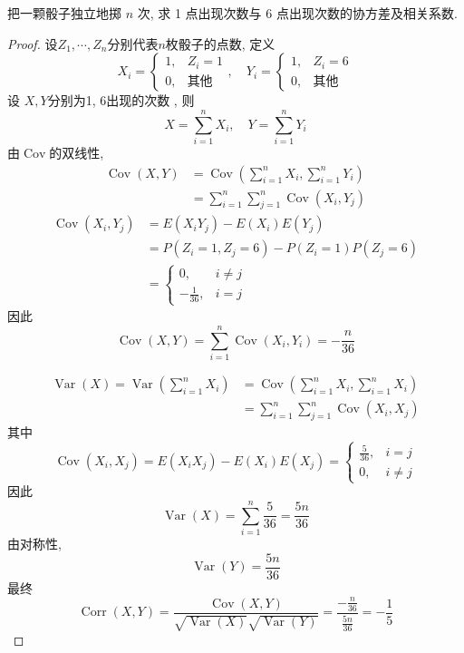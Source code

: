 \documentclass[../main.tex]{subfiles}
\begin{document}
\begin{exercise}{}{}
把一颗骰子独立地掷 \(n\) 次, 求 1 点出现次数与 6 点出现次数的协方差及相关系数.
\end{exercise}
\begin{proof}
  设\(  Z_1,\cdots ,Z_{n}  \)分别代表\(  n  \)枚骰子的点数, 定义 \[
  X_{i}= \begin{cases} 1,& Z_{i}= 1\\ 
   0,& \text{其他} \end{cases} ,\quad Y_{i}= \begin{cases} 1,&Z_{i}= 6\\ 
    0, & \text{其他} \end{cases} 
  \]  设 \(  X,Y  \)分别为1, 6出现的次数 , 则 \[
  X= \sum _{i= 1}^{n}X_{i}, \quad Y= \sum _{i= 1}^{n}Y_{i}
  \]由\(  \operatorname{Cov}  \)的双线性,  \[
  \begin{aligned}
  \operatorname{Cov}\left( X,Y \right)&= \operatorname{Cov}\left( \sum _{i= 1}^{n}X_{i},\sum _{i= 1}^{n}Y_{i} \right)\\ 
   &= \sum _{i = 1}^{n}\sum _{j= 1}^{n}\operatorname{Cov}\left( X_{i},Y_{j} \right)    
  \end{aligned}
  \]  \[
  \begin{aligned}
  \operatorname{Cov}\left( X_{i},Y_{j} \right)&= E\left( X_{i}Y_{j} \right)-E\left( X_{i} \right)E\left( Y_{j} \right)   \\ 
   &= P\left( Z_{i}= 1, Z_{j}= 6 \right) -P\left( Z_{i}= 1 \right)P\left( Z_{j}= 6 \right)  \\ 
    &= \begin{cases} 0,&i\neq j\\ 
     -\frac{1}{36},& i= j \end{cases} 
  \end{aligned}  
  \]因此 \[
  \operatorname{Cov}\left( X,Y \right) = \sum _{i = 1}^{n}\operatorname{Cov}\left( X_{i},Y_{i} \right)= -\frac{n }{36 }  
  \]

  \[
 \begin{aligned}
  \operatorname{Var}\left( X \right) = \operatorname{Var}\left( \sum _{i= 1}^{n}X_{i} \right)&= \operatorname{Cov}\left( \sum _{i= 1}^{n}X_{i},\sum _{i= 1}^{n}X_{i} \right)\\ 
   &= \sum _{i= 1}^{n}\sum _{j= 1}^{n}\operatorname{Cov}\left( X_{i},X_{j} \right)   
 \end{aligned} 
  \]其中 \[
  \operatorname{Cov}\left( X_{i},X_{j} \right)= E\left( X_{i}X_{j} \right)-E\left( X_{i} \right)E\left( X_{j} \right)= \begin{cases} \frac{5}{36},&i= j\\ 
   0,& i \neq j \end{cases}     
  \]因此 \[
  \operatorname{Var}\left( X \right)= \sum _{i= 1}^{n}\frac{5 }{36 }= \frac{5n }{36 }   
  \]由对称性, \[
  \operatorname{Var}\left( Y \right)= \frac{5n }{36 }  
  \]最终 \[
  \operatorname{Corr}\left( X,Y \right)= \frac{\operatorname{Cov}\left( X,Y \right)  }{\sqrt{\operatorname{Var}\left( X \right) }\sqrt{\operatorname{Var}\left( Y \right) } }= \frac{-\frac{n }{36 }  }{\frac{5n }{36 }  }   = -\frac{1}{5}
  \]
\end{proof}
\end{document}
